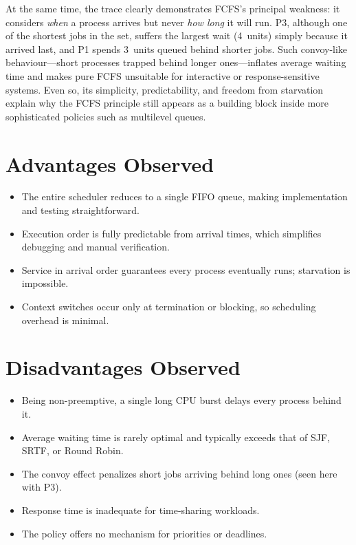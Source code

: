 \documentclass[12pt,a4paper]{article}
\begin{document}
At the same time, the trace clearly demonstrates FCFS's principal weakness: it
considers \emph{when} a process arrives but never \emph{how long} it will run.
P3, although one of the shortest jobs in the set, suffers the largest wait
(4~units) simply because it arrived last, and P1 spends 3~units queued behind
shorter jobs. Such convoy-like behaviour---short processes trapped behind
longer ones---inflates average waiting time and makes pure FCFS unsuitable for
interactive or response-sensitive systems. Even so, its simplicity,
predictability, and freedom from starvation explain why the FCFS principle
still appears as a building block inside more sophisticated policies such as
multilevel queues.

\section{Advantages Observed}

\begin{itemize}[leftmargin=*]
  \item The entire scheduler reduces to a single FIFO queue, making
        implementation and testing straightforward.
  \item Execution order is fully predictable from arrival times, which
        simplifies debugging and manual verification.
  \item Service in arrival order guarantees every process eventually runs;
        starvation is impossible.
  \item Context switches occur only at termination or blocking, so scheduling
        overhead is minimal.
\end{itemize}

\section{Disadvantages Observed}

\begin{itemize}[leftmargin=*]
  \item Being non-preemptive, a single long CPU burst delays every process
        behind it.
  \item Average waiting time is rarely optimal and typically exceeds that of
        SJF, SRTF, or Round Robin.
  \item The convoy effect penalizes short jobs arriving behind long ones
        (seen here with P3).
  \item Response time is inadequate for time-sharing workloads.
  \item The policy offers no mechanism for priorities or deadlines.
\end{itemize}
\end{document}
